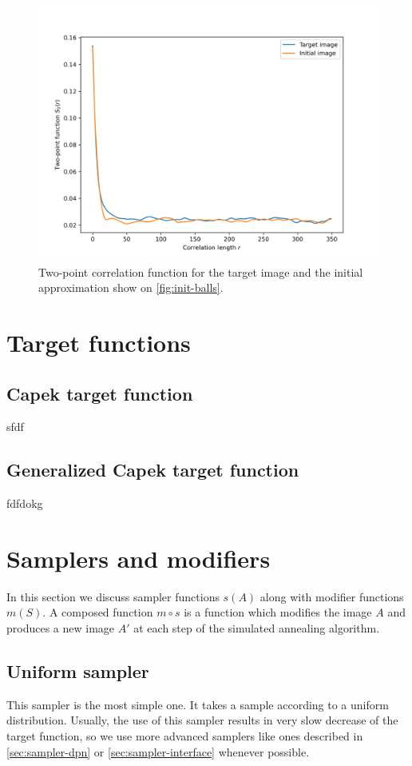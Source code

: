 \documentclass[preprint,amsmath,amssymb,aps,pre]{revtex4-1}
\begin{document}
\begin{figure}[ht]
  \centering
  \includegraphics[width=\linewidth]{../corrfns-plots/init-s2.png}
  \caption[]{Two-point correlation function for the target image and the initial
  approximation show on \cref{fig:init-balls}.}
  \label{fig:init-balls-s2}
\end{figure}

\section{Target functions}
\label{sec:target}
\subsection{Capek target function}
\label{sec:capek}
sfdf
\subsection{Generalized Capek target function}
\label{sec:capek-general}
fdfdokg

\section{Samplers and modifiers}
\label{sec:samplers-mods}
In this section we discuss sampler functions $s(A)$ along with modifier
functions $m(S)$. A composed function $m \circ s$ is a function which modifies
the image $A$ and produces a new image $A'$ at each step of the simulated
annealing algorithm. 
\subsection{Uniform sampler}
\label{sec:sampler-uniform}
This sampler is the most simple one. It takes a sample according to a uniform
distribution. Usually, the use of this sampler results in very slow decrease of
the target function, so we use more advanced samplers like ones described in
\cref{sec:sampler-dpn} or \cref{sec:sampler-interface} whenever possible.
\end{document}

